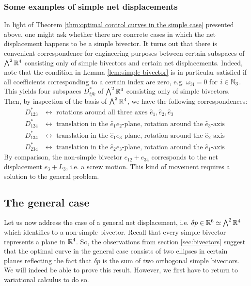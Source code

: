 \subsubsection{Some examples of simple net displacements}
In light of Theorem \ref{thm:optimal control curves in the simple case} presented above, one might ask whether there are concrete cases in which the net displacement happens to be a simple bivector. It turns out that there is convenient correspondence for engineering purposes between certain subspaces of $\bigwedge^2 \mathbb{R}^4$ consisting only of simple bivectors and certain net displacements. Indeed, note that the condition in Lemma \ref{lem:simple bivector} is in particular satisfied if all coefficients corresponding to a certain index are zero, e.g. $\omega_{i4} = 0$ for $i \in \mathbb{N}_3$. This yields four subspaces $D^*_{ijk}$ of $\bigwedge^2 \mathbb{R}^4$ consisting only of simple bivectors. Then, by inspection of the basis of $\bigwedge^2 \mathbb{R}^4$, we have the following correspondences:
\begin{align*}
D^{*}_{123} &\longleftrightarrow\text{ rotations around all three axes } \hat{e}_1, \hat{e}_2, \hat{e}_3\\
D^{*}_{124} &\longleftrightarrow \text{ translation in the $\hat{e}_1\hat{e}_2$-plane, rotation around the $\hat{e}_3$-axis }\\
D^{*}_{134} &\longleftrightarrow  \text{ translation in the $\hat{e}_1\hat{e}_3$-plane, rotation around the $\hat{e}_2$-axis }\\
D^{*}_{234} &\longleftrightarrow  \text{ translation in the $\hat{e}_2\hat{e}_3$-plane, rotation around the $\hat{e}_1$-axis }
\end{align*}
By comparison, the non-simple bivector $e_{12} + e_{34}$ corresponds to the net displacement $e_3 + L_3$, i.e. a screw motion. This kind of movement requires a solution to the general problem.


\subsection{The general case}

Let us now address the case of a general net displacement, i.e. $\delta p \in \mathbb{R}^6 \simeq \bigwedge^2 \mathbb{R}^4$ which identifies to a non-simple bivector. Recall that every simple bivector represents a plane in $\mathbb{R}^4$. So, the observations from section \ref{sec:bivectors} suggest that the optimal curve in the general case consists of two ellipses in certain planes reflecting the fact that $\delta p$ is the sum of two orthogonal simple bivectors. We will indeed be able to prove this result. However, we first have to return to variational calculus to do so.


